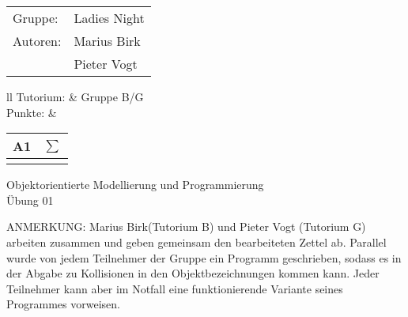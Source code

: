 \documentclass[12pt,a4paper,oneside,ngerman]{article}
\newcommand{\fach}{Objektorientierte Modellierung und Programmierung}
\newcommand{\dokumentenTitel}{Übung 01}
\begin{document}
	\thispagestyle{plain} %
	
	\begin{multicols}{2} %
		\hspace{-1cm} %
		\begin{tabular}{ll} %
			Gruppe: & Ladies Night \\
			Autoren: & Marius Birk \\ %
			& Pieter Vogt \\
		\end{tabular}
		
		\columnbreak %
		\hspace{-1cm} %
		\raggedleft \begin{tabular}{ll}
			Tutorium: &  Gruppe B/G \\
			Punkte: &     
			\renewcommand{\arraystretch}{1.2} %
			
			\begin{tabular}{|p{0.8cm}|p{0.8cm}|} %
				\hline A1&$\sum\limits^{ }$ \\ \hline %
				& \\ \hline   %
			\end{tabular}
		\end{tabular}	
	\end{multicols} %
	
	\begin{center}
		\Large{\fach} \\
		\LARGE{\dokumentenTitel} \\
		\small
\end{center}
ANMERKUNG: Marius Birk(Tutorium B) und Pieter Vogt (Tutorium G) arbeiten zusammen und geben gemeinsam den bearbeiteten Zettel ab. Parallel wurde von jedem Teilnehmer der Gruppe ein Programm geschrieben, sodass es in der Abgabe zu Kollisionen in den Objektbezeichnungen kommen kann. Jeder Teilnehmer kann aber im Notfall eine funktionierende Variante seines Programmes vorweisen.
\end{document}
